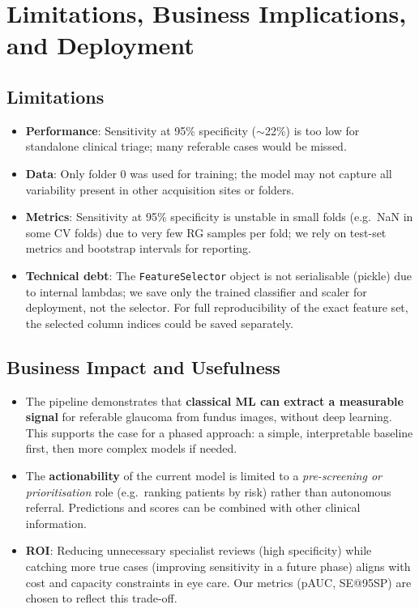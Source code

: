 \documentclass[11pt,a4paper]{article}
\begin{document}
\section{Limitations, Business Implications, and Deployment}

\subsection{Limitations}

\begin{itemize}
  \item \textbf{Performance}: Sensitivity at 95\% specificity ($\sim$22\%) is too low for standalone clinical triage; many referable cases would be missed.
  \item \textbf{Data}: Only folder 0 was used for training; the model may not capture all variability present in other acquisition sites or folders.
  \item \textbf{Metrics}: Sensitivity at 95\% specificity is unstable in small folds (e.g.\ NaN in some CV folds) due to very few RG samples per fold; we rely on test-set metrics and bootstrap intervals for reporting.
  \item \textbf{Technical debt}: The \texttt{FeatureSelector} object is not serialisable (pickle) due to internal lambdas; we save only the trained classifier and scaler for deployment, not the selector. For full reproducibility of the exact feature set, the selected column indices could be saved separately.
\end{itemize}

\subsection{Business Impact and Usefulness}

\begin{itemize}
  \item The pipeline demonstrates that \textbf{classical ML can extract a measurable signal} for referable glaucoma from fundus images, without deep learning. This supports the case for a phased approach: a simple, interpretable baseline first, then more complex models if needed.
  \item The \textbf{actionability} of the current model is limited to a \emph{pre-screening or prioritisation} role (e.g.\ ranking patients by risk) rather than autonomous referral. Predictions and scores can be combined with other clinical information.
  \item \textbf{ROI}: Reducing unnecessary specialist reviews (high specificity) while catching more true cases (improving sensitivity in a future phase) aligns with cost and capacity constraints in eye care. Our metrics (pAUC, SE@95SP) are chosen to reflect this trade-off.
\end{itemize}
\end{document}
